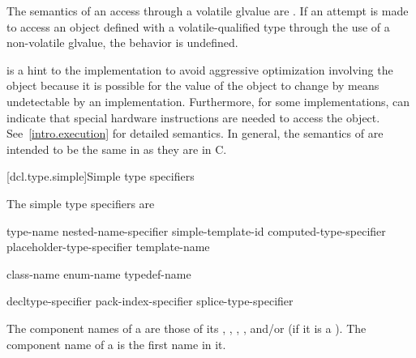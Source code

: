 \pnum
The semantics of an access through a volatile glvalue are
.
If an attempt is made to access an object defined with a
volatile-qualified type through the use of a non-volatile glvalue,
the behavior is undefined.

\pnum
{}%
%
\begin{note}
 is a hint to the implementation to avoid aggressive
optimization involving the object because it is possible for the value of the object
to change by means undetectable by an implementation.
Furthermore, for some implementations,  can indicate that
special hardware instructions are needed to access the object.
See~\ref{intro.execution} for detailed semantics. In general, the
semantics of  are intended to be the same in \Cpp{} as
they are in C.
\end{note}

[dcl.type.simple]{Simple type specifiers}%

\pnum
The simple type specifiers are
\begin{bnf}
\br
     type-name\br
    nested-name-specifier  simple-template-id\br
    computed-type-specifier\br
    placeholder-type-specifier\br
     template-name\br
    \br
    \br
    \br
    \br
    \br
    \br
    \br
    \br
    \br
    \br
    \br
    \br
    \br
\end{bnf}

\begin{bnf}
\br
    class-name\br
    enum-name\br
    typedef-name
\end{bnf}

\begin{bnf}
\br
    decltype-specifier\br
    pack-index-specifier\br
    splice-type-specifier
\end{bnf}

\pnum
{}
The component names of a  are those of its
,
,
,
, and/or
(if it is a ).
The component name of a  is the first name in it.

